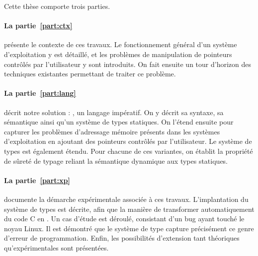 Cette thèse comporte trois parties.

\paragraph{La partie~\ref{part:ctx}} présente le contexte de ces travaux. Le
fonctionnement général d'un système d'exploitation y est détaillé, et les
problèmes de manipulation de pointeurs contrôlés par l'utilisateur y sont
introduits. On fait ensuite un tour d'horizon des techniques existantes
permettant de traiter ce problème.

\paragraph{La partie~\ref{part:lang}} décrit notre solution : \langname, un
langage impératif. On y décrit sa syntaxe, sa sémantique ainsi qu'un système de
types statiques. On l'étend ensuite pour capturer les problèmes d'adressage
mémoire présents dans les systèmes d'exploitation en ajoutant des pointeurs
contrôlés par l'utilisateur. Le système de types est également étendu. Pour
chacune de ces variantes, on établit la propriété de sûreté de typage reliant la
sémantique dynamique aux types statiques.

\paragraph{La partie~\ref{part:xp}} documente la démarche expérimentale associée
à ces travaux. L'implantation du système de types est décrite, afin que la
manière de transformer automatiquement du code C en \langname. Un cas d'étude
est déroulé, consistant d'un bug ayant touché le noyau Linux. Il est démontré
que le système de type capture précisément ce genre d'erreur de programmation.
Enfin, les possibilités d'extension tant théoriques qu'expérimentales sont
présentées.

